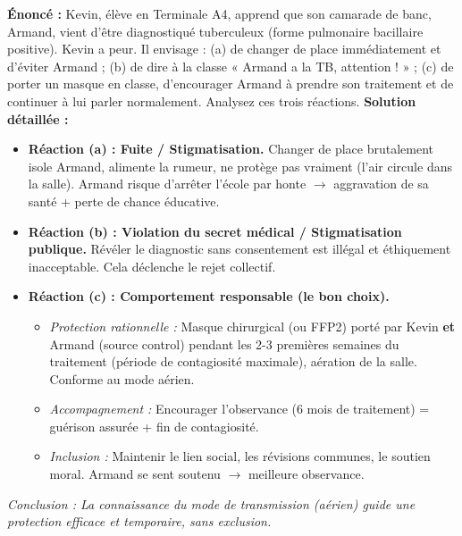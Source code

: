 \documentclass[11pt]{article}
\begin{document}
\begin{exoresolu}
\textbf{Énoncé :} Kevin, élève en Terminale A4, apprend que son camarade de banc, Armand, vient d'être diagnostiqué tuberculeux (forme pulmonaire bacillaire positive). Kevin a peur. Il envisage : (a) de changer de place immédiatement et d'éviter Armand ; (b) de dire à la classe « Armand a la TB, attention ! » ; (c) de porter un masque en classe, d'encourager Armand à prendre son traitement et de continuer à lui parler normalement. Analysez ces trois réactions.
\tcblower
\textbf{Solution détaillée :}
\begin{itemize}
    \item \textbf{Réaction (a) : Fuite / Stigmatisation.} Changer de place brutalement isole Armand, alimente la rumeur, ne protège pas vraiment (l'air circule dans la salle). Armand risque d'arrêter l'école par honte $\to$ aggravation de sa santé + perte de chance éducative.
    \item \textbf{Réaction (b) : Violation du secret médical / Stigmatisation publique.} Révéler le diagnostic sans consentement est illégal et éthiquement inacceptable. Cela déclenche le rejet collectif.
    \item \textbf{Réaction (c) : \textbf{Comportement responsable (le bon choix).}} 
    \begin{itemize}
        \item \textit{Protection rationnelle :} Masque chirurgical (ou FFP2) porté par Kevin \textbf{et} Armand (source control) pendant les 2-3 premières semaines du traitement (période de contagiosité maximale), aération de la salle. Conforme au mode aérien.
        \item \textit{Accompagnement :} Encourager l'observance (6 mois de traitement) = guérison assurée + fin de contagiosité.
        \item \textit{Inclusion :} Maintenir le lien social, les révisions communes, le soutien moral. Armand se sent soutenu $\to$ meilleure observance.
    \end{itemize}
\end{itemize}
\emph{Conclusion : La connaissance du mode de transmission (aérien) guide une protection efficace et temporaire, sans exclusion.}
\end{exoresolu}
\end{document}
